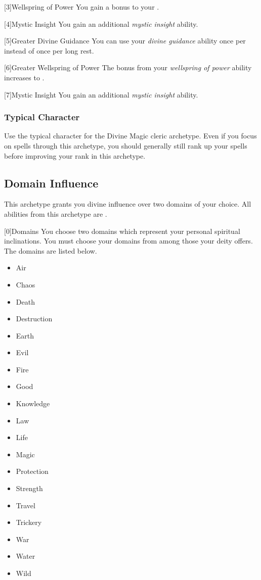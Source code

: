         [3]{Wellspring of Power}
        You gain a  bonus to your  .

        [4]{Mystic Insight}
        You gain an additional \textit{mystic insight} ability.

        [5]{Greater Divine Guidance} You can use your \textit{divine guidance} ability once per  instead of once per long rest.

        [6]{Greater Wellspring of Power} The bonus from your \textit{wellspring of power} ability increases to .

        [7]{Mystic Insight}
        You gain an additional \textit{mystic insight} ability.

        \subsubsection{Typical Character}
            Use the typical character for the Divine Magic cleric archetype.
            Even if you focus on spells through this archetype, you should generally still rank up your spells before improving your rank in this archetype.

    \newpage
    \subsection{Domain Influence}
        This archetype grants you divine influence over two domains of your choice.
        All abilities from this archetype are .

        [0]{Domains}
        You choose two domains which represent your personal spiritual inclinations.
        You must choose your domains from among those your deity offers.
        The domains are listed below.

        \begin{itemize}
            \item{Air}
            \item{Chaos}
            \item{Death}
            \item{Destruction}
            \item{Earth}
            \item{Evil}
            \item{Fire}
            \item{Good}
            \item{Knowledge}
            \item{Law}
            \item{Life}
            \item{Magic}
            \item{Protection}
            \item{Strength}
            \item{Travel}
            \item{Trickery}
            \item{War}
            \item{Water}
            \item{Wild}
        \end{itemize}

